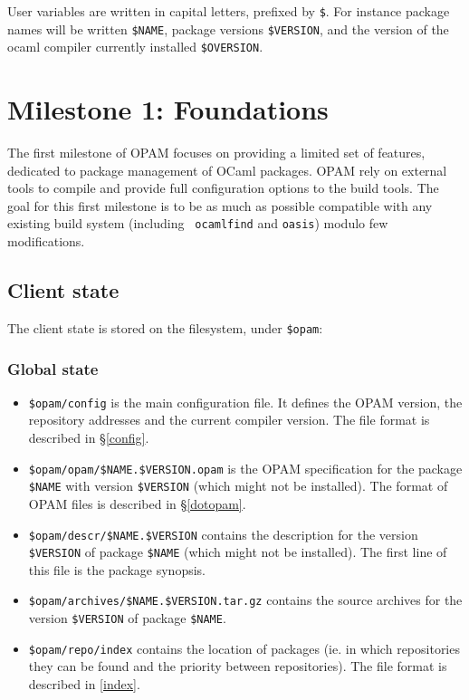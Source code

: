 \documentclass[a4paper,11pt]{article}
\begin{document}
User variables are written in capital letters, prefixed by \verb+$+. For
instance package names will be written \verb+$NAME+, package versions
\verb+$VERSION+, and the version of the ocaml compiler currently
installed \verb+$OVERSION+.

\section{Milestone 1: Foundations}

The first milestone of OPAM focuses on providing a limited set of
features, dedicated to package management of OCaml packages. OPAM rely
on external tools to compile and provide full configuration options to
the build tools. The goal for this first milestone is to be as much as
possible compatible with any existing build system (including {\tt
  ocamlfind} and {\tt oasis}) modulo few modifications.

\subsection{Client state}
\label{client}

The client state is stored on the filesystem, under {\tt \$opam}:

\subsubsection{Global state}
\label{state-global}

\begin{itemize}

\item {\tt \$opam/config} is the main configuration file. It defines
  the OPAM version, the repository addresses and the current compiler
  version. The file format is described in \S\ref{config}.

\item \verb+$opam/opam/$NAME.$VERSION.opam+ is the OPAM specification
  for the package \verb+$NAME+ with version \verb+$VERSION+ (which
  might not be installed). The format of OPAM files is described in
  \S\ref{dotopam}.

\item \verb+$opam/descr/$NAME.$VERSION+ contains the description for the
  version \verb+$VERSION+ of package \verb+$NAME+ (which might not be
  installed). The first line of this file is the package synopsis.

\item \verb+$opam/archives/$NAME.$VERSION.tar.gz+ contains the source
  archives for the version \verb+$VERSION+ of package \verb+$NAME+.

\item \verb+$opam/repo/index+ contains the location of packages
  (ie. in which repositories they can be found and the priority
  between repositories). The file format is described in
  \ref{index}.

\end{itemize}
\end{document}
